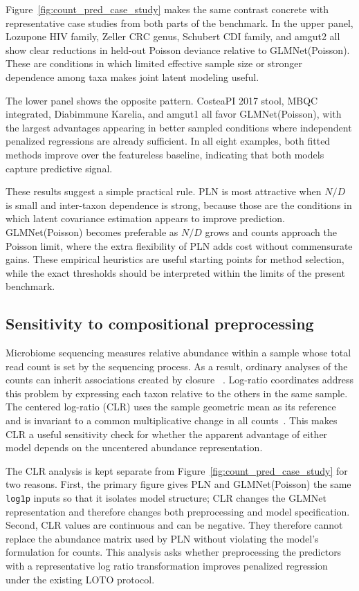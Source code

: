 \documentclass[USenglish]{article}
\theoremstyle{dgthm}
\begin{document}
Figure~\ref{fig:count_pred_case_study} makes the same contrast concrete with representative case studies from both parts of the benchmark.
In the upper panel, Lozupone HIV family, Zeller CRC genus, Schubert CDI family, and amgut2 all show clear reductions in held-out Poisson deviance relative to GLMNet(Poisson).
These are conditions in which limited effective sample size or stronger dependence among taxa makes joint latent modeling useful.

The lower panel shows the opposite pattern.
CosteaPI 2017 stool, MBQC integrated, Diabimmune Karelia, and amgut1 all favor GLMNet(Poisson), with the largest advantages appearing in better sampled conditions where independent penalized regressions are already sufficient.
In all eight examples, both fitted methods improve over the featureless baseline, indicating that both models capture predictive signal.


These results suggest a simple practical rule.
PLN is most attractive when $N/D$ is small and inter-taxon dependence is strong, because those are the conditions in which latent covariance estimation appears to improve prediction.
GLMNet(Poisson) becomes preferable as $N/D$ grows and counts approach the Poisson limit, where the extra flexibility of PLN adds cost without commensurate gains.
These empirical heuristics are useful starting points for method selection, while the exact thresholds should be interpreted within the limits of the present benchmark.

\subsection{Sensitivity to compositional preprocessing}
\label{subsec:clr-sensitivity-results}

Microbiome sequencing measures relative abundance within a sample whose total read count is set by the sequencing process.
As a result, ordinary analyses of the counts can inherit associations created by closure ~\citep{Gloor2017Compositional,Tsilimigras2016Compositional}.
Log-ratio coordinates address this problem by expressing each taxon relative to the others in the same sample.
The centered log-ratio (CLR) uses the sample geometric mean as its reference and is invariant to a common multiplicative change in all counts~\citep{Gloor2017Compositional}.
This makes CLR a useful sensitivity check for whether the apparent advantage of either model depends on the uncentered abundance representation.

The CLR analysis is kept separate from Figure~\ref{fig:count_pred_case_study} for two reasons.
First, the primary figure gives PLN and GLMNet(Poisson) the same \texttt{log1p} inputs so that it isolates model structure; CLR changes the GLMNet representation and therefore changes both preprocessing and model specification.
Second, CLR values are continuous and can be negative. 
They therefore cannot replace the abundance matrix used by PLN without violating the model's formulation for counts.
This analysis asks whether preprocessing the predictors with a representative log ratio transformation improves penalized regression under the existing LOTO protocol.
\end{document}
